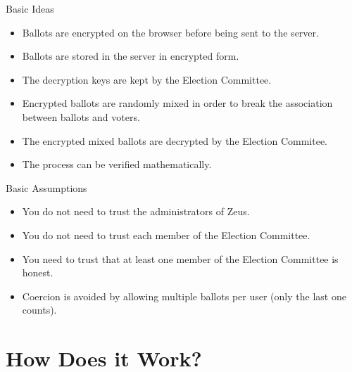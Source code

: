 \documentclass[utf8]{beamer}
\begin{document}
\begin{frame}{Basic Ideas}

\begin{itemize}
\item Ballots are encrypted on the browser before being sent to the
  server.
\item Ballots are stored in the server in encrypted form.
\item The decryption keys are kept by the Election Committee.
\item Encrypted ballots are randomly mixed in order to break the
  association between ballots and voters.
\item The encrypted mixed ballots are decrypted by the Election
  Commitee.
\item The process can be verified mathematically.
\end{itemize}

\end{frame}

\begin{frame}{Basic Assumptions}

\begin{itemize}
\item You do not need to trust the administrators of Zeus.
\item You do not need to trust each member of the Election Committee.
\item You need to trust that at least one member of the Election
  Committee is honest.
\item Coercion is avoided by allowing multiple ballots per user (only
  the last one counts).
\end{itemize}

\end{frame}

\section{How Does it Work?}
\end{document}
